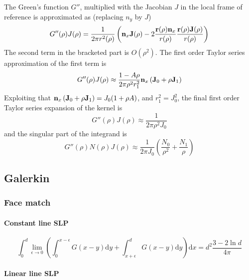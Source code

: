 \documentclass[a4paper,11pt]{article}
\newcommand{\td}{\mathrm{d}}
\begin{document}
The Green's function $G''$, multiplied with the Jacobian $J$ in the local frame of reference is approximated as (replacing $n_y$ by $J$)
%
\begin{equation}
	G''(\rho) J(\rho)
	= \frac{1}{2\pi r^2(\rho)} \left( {\bf n}_x {\bf J}(\rho) - 2 \frac{{\bf r}(\rho) {\bf n}_x}{r(\rho)} \frac{{\bf r}(\rho) {\bf J}(\rho)}{r(\rho)}\right)
\end{equation}
%
The second term in the bracketed part is $O(\rho^2)$.
The first order Taylor series approximation of the first term is
%
\begin{equation}
	G''(\rho) J(\rho) \approx \frac{1 - A \rho}{2\pi \rho^2 r_1^2} {\bf n}_x \left({\bf J}_0 + \rho {\bf J}_1\right) 
\end{equation}
%
Exploiting that ${\bf n}_x \left({\bf J}_0 + \rho {\bf J}_1\right) = J_0 (1 + \rho A)$, and $r_1^2 = J_0^2$, the final first order Taylor series expansion of the kernel is
%
\begin{equation}
	G''(\rho) J(\rho) \approx \frac{1}{2\pi \rho^2 J_0}
\end{equation}
%
and the singular part of the integrand is
%
\begin{equation}
	G''(\rho) N(\rho) J(\rho) \approx \frac{1}{2\pi J_0} \left( \frac{N_0}{\rho^2} +  \frac{N_1}{\rho} \right)
\end{equation}


\subsection{Galerkin}

\subsubsection{Face match}

\paragraph{Constant line SLP}

\begin{equation}
\int_{0}^{d}
\lim_{\epsilon \to 0}
\left(
\int_{0}^{x-\epsilon} G(x-y) \td y
+
\int_{x+\epsilon}^{d} G(x-y) \td y
\right)
\td x
=
d^2\frac{3-2\ln d}{4\pi}
\end{equation}

\paragraph{Linear line SLP}
\end{document}
